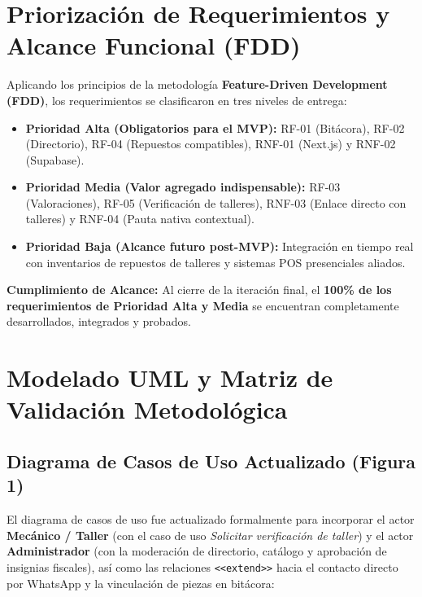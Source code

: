\documentclass[11pt,letterpaper]{article}
\begin{document}
\section{Priorización de Requerimientos y Alcance Funcional (FDD)}

Aplicando los principios de la metodología \textbf{Feature-Driven Development (FDD)}, los requerimientos se clasificaron en tres niveles de entrega:
\begin{itemize}
    \item \textbf{Prioridad Alta (Obligatorios para el MVP):} RF-01 (Bitácora), RF-02 (Directorio), RF-04 (Repuestos compatibles), RNF-01 (Next.js) y RNF-02 (Supabase).
    \item \textbf{Prioridad Media (Valor agregado indispensable):} RF-03 (Valoraciones), RF-05 (Verificación de talleres), RNF-03 (Enlace directo con talleres) y RNF-04 (Pauta nativa contextual).
    \item \textbf{Prioridad Baja (Alcance futuro post-MVP):} Integración en tiempo real con inventarios de repuestos de talleres y sistemas POS presenciales aliados.
\end{itemize}

\begin{successcallout}
\textbf{Cumplimiento de Alcance:} Al cierre de la iteración final, el \textbf{100\% de los requerimientos de Prioridad Alta y Media} se encuentran completamente desarrollados, integrados y probados.
\end{successcallout}

\newpage

\section{Modelado UML y Matriz de Validación Metodológica}

\subsection{Diagrama de Casos de Uso Actualizado (Figura 1)}
El diagrama de casos de uso fue actualizado formalmente para incorporar el actor \textbf{Mecánico / Taller} (con el caso de uso \textit{Solicitar verificación de taller}) y el actor \textbf{Administrador} (con la moderación de directorio, catálogo y aprobación de insignias fiscales), así como las relaciones \texttt{<<extend>>} hacia el contacto directo por WhatsApp y la vinculación de piezas en bitácora:
\end{document}
